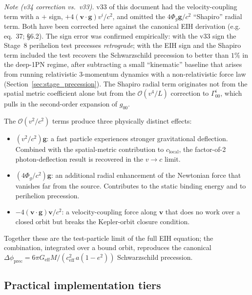 \documentclass[11pt,a4paper]{article}
\newcommand{\vv}[1]{\mathbf{#1}}
\newcommand{\Phig}{\Phi_g}
\newcommand{\order}[1]{\mathcal{O}(#1)}
\begin{document}
\textit{Note (v34 correction vs.\ v33).}  v33 of this document had the
velocity-coupling term with a $+$ sign, $+4(\vv{v}\cdot\vv{g})v^i/c^2$, and
omitted the $4\Phig\vv{g}/c^2$ ``Shapiro'' radial term.  Both have been
corrected here against the canonical EIH derivation
(e.g.\ \cite{AliHaimoud2019} eq.~37; \cite{Will1993} \S6.2).  The sign error was confirmed
empirically: with the v33 sign the Stage~8 perihelion test precesses
\emph{retrograde}; with the EIH sign and the Shapiro term included the test
recovers the Schwarzschild precession to better than $1\%$ in the
deep-1PN regime, after subtracting a small ``kinematic'' baseline that arises
from running relativistic 3-momentum dynamics with a non-relativistic force
law (Section~\ref{sec:stage_precession}).  The Shapiro radial term
originates not from the spatial metric coefficient alone but from the
$\order{v^4/L}$ correction to $\Gamma^i_{00}$, which pulls in the second-order
expansion of $g_{00}$.

The $\order{v^2/c^2}$ terms produce three physically distinct effects:
\begin{itemize}
  \item $(v^2/c^2)\vv{g}$: a fast particle experiences stronger
    gravitational deflection.  Combined with the spatial-metric
    contribution to $c_{\mathrm{local}}$, the factor-of-2 photon-deflection
    result is recovered in the $v\to c$ limit.
  \item $(4\Phig/c^2)\vv{g}$: an additional radial enhancement of the
    Newtonian force that vanishes far from the source.  Contributes to the
    static binding energy and to perihelion precession.
  \item $-4(\vv{v}\cdot\vv{g})\vv{v}/c^2$: a velocity-coupling force along
    $\vv{v}$ that does no work over a closed orbit but breaks the
    Kepler-orbit closure condition.
\end{itemize}
Together these are the test-particle limit of the full EIH equation; the
combination, integrated over a bound orbit, reproduces the canonical
$\Delta\phi_{\mathrm{prec}} = 6\pi G_{\mathrm{eff}} M / (c_{\mathrm{eff}}^2\,a(1-e^2))$
Schwarzschild precession.

\subsection{Practical implementation tiers}
\end{document}
